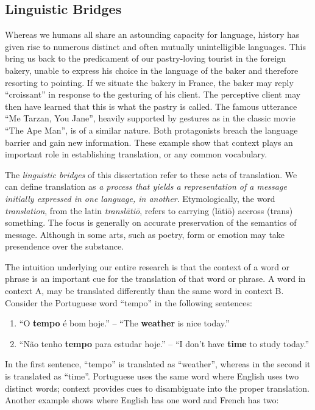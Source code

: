 \subsection{Linguistic Bridges}
\label{sec:bridges}

Whereas we humans all share an astounding capacity for language, history has
given rise to numerous distinct and often mutually unintelligible languages.
This bring us back to the predicament of our pastry-loving tourist in the
foreign bakery, unable to express his choice in the language of the baker and
therefore resorting to pointing. If we situate the bakery in France, the baker
may reply ``croissant'' in response to the gesturing of his client. The
perceptive client may then have learned that this is what the pastry is called.
The famous utterance ``Me Tarzan, You Jane'', heavily supported by gestures as
in the classic movie ``The Ape Man'', is of a similar nature. Both protagonists
breach the language barrier and gain new information. These example show that
context plays an important role in establishing translation, or any common
vocabulary. 

The \emph{linguistic bridges} of this dissertation refer to these acts of
translation. We can define translation as \emph{a process that yields a
representation of a message initially expressed in one language, in another}.
Etymologically, the word \emph{translation}, from the latin \emph{transl\=ati\=o},
refers to carrying (l\=ati\=o) accross (trans) something. The focus is generally on
accurate preservation of the semantics of message.  Although in some arts, such
as poetry, form or emotion may take presendence over the substance.

The intuition underlying our entire research is that the context of a word or phrase is
an important cue for the translation of that word or phrase. A word in context
A, may be translated differently than the same word in context B. Consider the
Portuguese word ``tempo'' in the following sentences:

\begin{enumerate}
\item ``O \textbf{tempo} é bom hoje.'' -- ``The \textbf{weather} is nice today.''
\item ``Não tenho \textbf{tempo} para estudar hoje.'' -- ``I don't have \textbf{time} to study today.''
\end{enumerate}

In the first sentence, ``tempo'' is translated as ``weather'', whereas in the
second it is translated as ``time''. Portuguese uses the same word where
English uses two distinct words; context provides cues to disambiguate into the
proper translation. Another example shows where English has one word and French has two:

